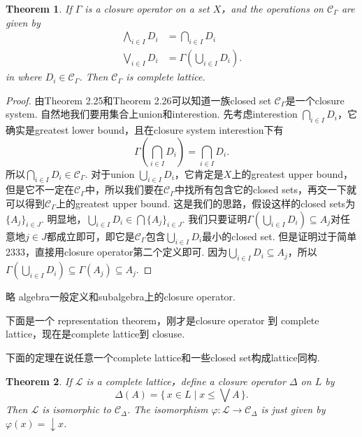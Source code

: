 \documentclass{article}
\newtheorem{theorem}{Theorem}[section]
\newcommand*{\xfunc}[4]{{#2}\colon{#3}{#1}{#4}}
\newcommand*{\func}[3]{\xfunc{\to}{#1}{#2}{#3}}
\newcommand\Set[2]{\{\,#1\mid#2\,\}} %
\newcommand\lattice{\mathcal{L}}
\begin{document}
\begin{theorem}
\rm If $\Gamma$ is a closure operator on a set $X$，and {\color{red} the operations on $\mathcal{C}_\Gamma$} are given by 
$$
\begin{aligned}
\bigwedge\limits_{i \in I} D_i &= \bigcap\limits_{i \in I} D_i \\
\bigvee\limits_{i \in I} D_i &= \Gamma(\bigcup\limits_{i \in I} D_i).
\end{aligned}
$$
in where $D_i \in \mathcal{C}_{\Gamma}$. Then $\mathcal{C}_\Gamma$ is complete lattice.
\end{theorem}

\begin{proof}
由Theorem 2.25和Theorem 2.26可以知道一族closed set $\mathcal{C}_{\Gamma}$是一个closure system. 自然地我们要用集合上union和interestion. 先考虑interestion $\bigcap\limits_{i \in I} D_i$，它确实是greatest lower bound，且在closure system interestion下有
$$
\Gamma(\bigcap\limits_{i \in I} D_i) = \bigcap\limits_{i \in I} D_i.
$$
所以$\bigcap\limits_{i \in I} D_i \in \mathcal{C}_{\Gamma}$. 对于union $\bigcup\limits_{i \in I} D_i$，它肯定是$X$上的greatest upper bound，但是它不一定在$\mathcal{C}_{\Gamma}$中，所以我们要在$\mathcal{C}_{\Gamma}$中找所有包含它的closed sets，再交一下就可以得到$\mathcal{C}_{\Gamma}$上的greatest upper bound. 这是我们的思路，假设这样的closed sets为$\{A_j\}_{i \in J}$. 明显地，$\bigcup\limits_{i \in I} D_i \in \bigcap \{A_j\}_{i \in J}$. 我们只要证明$\Gamma(\bigcup\limits_{i \in I} D_i) \subseteq A_j$对任意地$j \in J$都成立即可，即它是$\mathcal{C}_{\Gamma}$包含$\bigcup\limits_{i \in I} D_i$最小的closed set. 但是证明过于简单2333，直接用closure operator第二个定义即可. 因为$\bigcup\limits_{i \in I} D_i \subseteq A_j$，所以$\Gamma(\bigcup\limits_{i \in I} D_i) \subseteq \Gamma(A_j) \subseteq A_j$. 
\end{proof}

略{\color{red} algebra一般定义和subalgebra上的closure operator}.

下面是一个{\color{red} representation theorem，刚才是closure operator 到 complete lattice，现在是complete lattice到 closuse}.

{\color{blue} 下面的定理在说任意一个complete lattice和一些closed set构成lattice同构}.

\begin{theorem}
\rm If $\lattice$ is a complete lattice，define a closure operator $\Delta$ on $L$ by
$$
\Delta(A) = \Set{x \in L}{x \leq \bigvee A}.
$$
Then {\color{red} $\lattice$ is isomorphic to $\mathcal{C}_{\Delta}$}. The isomorphism $\func{\varphi}{\lattice}{\mathcal{C}_{\Delta}}$ is just given by $\varphi(x) = \downarrow x$.
\end{theorem}
\end{document}

